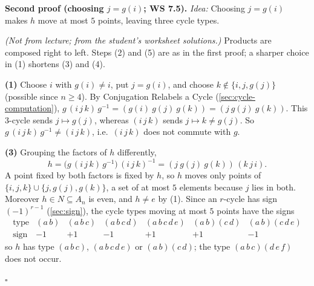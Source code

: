 \documentclass[11pt]{report}
\renewenvironment{proof}[1][Proof]{\noindent\textbf{#1.} }{\hfill$\square$\par\vspace{5pt}}
\begin{document}
\begin{proof}[Second proof (choosing $j = g(i)$; WS 7.5)]
\textit{Idea:} Choosing $j = g(i)$ makes $h$ move at most $5$ points, leaving three cycle types.\par
\textit{(Not from lecture; from the student's worksheet solutions.)} Products are composed right to left. Steps (2) and (5) are as in the first proof; a sharper choice in (1) shortens (3) and (4).

\textbf{(1)} Choose $i$ with $g(i) \neq i$, put $j = g(i)$, and choose $k \notin \{i, j, g(j)\}$ (possible since $n \geq 4$). By Conjugation Relabels a Cycle (\ref{sec:cycle-computation}), $g\,(i\,j\,k)\,g^{-1} = (g(i)\ g(j)\ g(k)) = (j\ g(j)\ g(k))$. This $3$-cycle sends $j \mapsto g(j)$, whereas $(i\,j\,k)$ sends $j \mapsto k \neq g(j)$. So $g\,(i\,j\,k)\,g^{-1} \neq (i\,j\,k)$, i.e.\ $(i\,j\,k)$ does not commute with $g$.

\textbf{(3)} Grouping the factors of $h$ differently,
\[ h = \big(g\,(i\,j\,k)\,g^{-1}\big)\,(i\,j\,k)^{-1} = (j\ g(j)\ g(k))\,(k\,j\,i). \]
A point fixed by both factors is fixed by $h$, so $h$ moves only points of $\{i, j, k\} \cup \{j, g(j), g(k)\}$, a set of at most $5$ elements because $j$ lies in both. Moreover $h \in N \subseteq A_n$ is even, and $h \neq e$ by (1). Since an $r$-cycle has sign $(-1)^{r-1}$ (\ref{sec:sign}), the cycle types moving at most $5$ points have the signs
\[ \begin{array}{c|cccccc} \text{type} & (a\,b) & (a\,b\,c) & (a\,b\,c\,d) & (a\,b\,c\,d\,e) & (a\,b)(c\,d) & (a\,b)(c\,d\,e) \\ \hline \text{sign} & -1 & +1 & -1 & +1 & +1 & -1 \end{array} \]
so $h$ has type $(a\,b\,c)$, $(a\,b\,c\,d\,e)$ or $(a\,b)(c\,d)$; the type $(a\,b\,c)(d\,e\,f)$ does not occur.


\end{proof}
\end{document}
